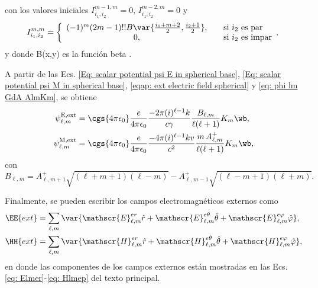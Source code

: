 con los valores iniciales $I_{i_1,i_2}^{m-1,m}=0$, $I_{i_1,i_2}^{m-2,m}=0$ y
\begin{equation}
I_{i_1,i_2}^{m,m} = 
\left\{ 
  \begin{array}{ c l }
    (-1)^m (2m-1)!! B\var{\frac{i_1 + m +2}{2}, \frac{i_2+1}{2}}, & \quad \textrm{si } i_2 \textrm{ es par} \\
    0,                 & \quad \textrm{si } i_2 \textrm{ es impar}
  \end{array},
\right.
\end{equation}
y donde B(x,y) es la función beta \citep{Abramowitz}.

A partir de las Ecs. \eqref{Eq: scalar potential psi E in spherical base}, \eqref{Eq: scalar potential psi M in spherical base}, \eqref{eqap: ext electric field spherical} y \eqref{eq: phi lm GdA AlmKm}, se obtiene 
\begin{align}
\psi_{\ell, m}^{\rm E, ext} &= \cgs{4\pi\epsilon_0}\frac{e}{4\pi\epsilon_0}\frac{-2\pi(i)^{\ell-1}k}{c \gamma}\frac{B_{\ell,m}}{\ell(\ell+1)}K_m\wb, \\
\psi_{\ell, m}^{\rm M, ext} &= \cgs{4\pi\epsilon_0}\frac{e}{4\pi\epsilon_0}\frac{-4\pi(i)^{\ell-1}k v}{c^2}\frac{m\, A^{+}_{\ell,m}}{\ell(\ell+1)}K_m\wb,
\end{align}
con
\begin{equation}
B_{\ell, m} = A_{\ell,m+1}^{+}\sqrt{(\ell + m+1)(\ell-m)}-A_{\ell,m-1}^{+}\sqrt{(\ell - m+1)(\ell+m)}.
\end{equation}

Finalmente, se pueden escribir los campos electromagnéticos externos como 
\begin{align}
\EE{ext} &= \sum_{\ell,m}\var{\mathscr{E}_{\ell, m}^{er}\hat{r} + \mathscr{E}_{\ell, m}^{e\theta}\hat{\theta}+\mathscr{E}_{\ell, m}^{e\varphi}\hat{\varphi}},\\
\HH{ext} &= \sum_{\ell,m}\var{\mathscr{H}_{\ell, m}^{er}\hat{r} + \mathscr{H}_{\ell, m}^{e\theta}\hat{\theta}+\mathscr{H}_{\ell, m}^{e\varphi}\hat{\varphi}},
\end{align}
en donde las componentes de los campos externos están mostradas en las Ecs. \eqref{eq: Elmer}-\eqref{eq: Hlmep} del texto principal.
